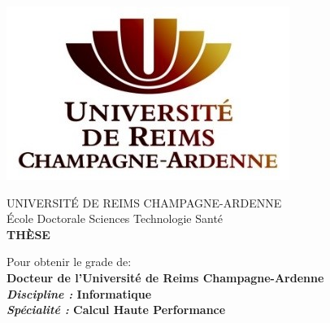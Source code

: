 \documentclass[11pt,a4paper]{book}
\begin{document}
\newcommand{\phdAuthor}{Julien LOISEAU}
\newcommand{\defenseDate}{le 18 Mars 2018}
\newcommand{\phdDiscipline}{Informatique}
\newcommand{\phdSpeciality}{Calcul Haute Performance}
\newcommand{\phdTitleEN}{Hybrids Architectures to Reach Exascale}
\newcommand{\phdTitleFR}{Les Architectures Hybrides pour Atteindre l'Exascale}
\newcommand{\phdDirector}{Michaël KRAJECKI, Professeur des Universités}


\thispagestyle{empty}
{
\centering

{
	\includegraphics[scale=1]{figures/style/logo_urca_front_page.jpg}
	\vspace{0.5cm}
}

{
	UNIVERSIT\'E DE REIMS CHAMPAGNE-ARDENNE\\
	\vspace{0.5cm}
	\'Ecole Doctorale Sciences Technologie Sant\'e\\
	\vspace{1cm}
	\huge
	\textbf{TH\`ESE}
	\vspace{.5cm}
}

{
	Pour obtenir le grade de:\\ 
	\vspace{.4cm}
	\Large 
	\textbf{Docteur de l'Université de Reims Champagne-Ardenne}\\
	\vspace{.4cm}
	\large
	\textbf{\textit{Discipline : }\phdDiscipline}\\
	\vspace{.4cm}
	\textbf{\textit{Sp\'ecialit\'e : }\phdSpeciality}
}

}
\end{document}
